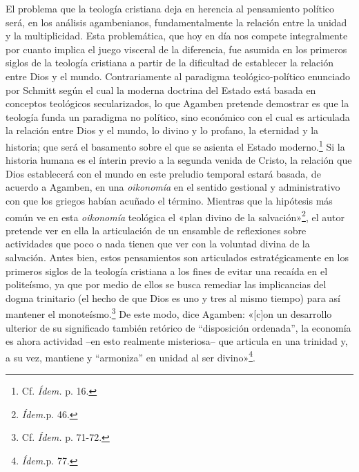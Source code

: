 El problema que la teología cristiana deja en herencia al pensamiento político será, en los análisis agambenianos, fundamentalmente la relación entre la unidad y la multiplicidad. Esta problemática, que hoy en día nos compete integralmente por cuanto implica el juego visceral de la diferencia, fue asumida en los primeros siglos de la teología cristiana a partir de la dificultad de establecer la relación entre Dios y el mundo. Contrariamente al paradigma teológico-político enunciado por Schmitt según el cual la moderna doctrina del Estado está basada en conceptos teológicos secularizados, lo que Agamben pretende demostrar es que la teología funda un paradigma no político, sino económico con el cual es articulada la relación entre Dios y el mundo, lo divino y lo profano, la eternidad y la historia; que será el basamento sobre el que se asienta el Estado moderno.\footnote{Cf. \emph{Ídem.} p. 16.} Si la historia humana es el ínterin previo a la segunda venida de Cristo, la relación que Dios establecerá con el mundo en este preludio temporal estará basada, de acuerdo a Agamben, en una \emph{oikonomía} en el sentido gestional y administrativo con que los griegos habían acuñado el término. Mientras que la hipótesis más común ve en esta \emph{oikonomía} teológica el «plan divino de la salvación»\footnote{\emph{Ídem.}p. 46.}, el autor pretende ver en ella la articulación de un ensamble de reflexiones sobre actividades que poco o nada tienen que ver con la voluntad divina de la salvación. Antes bien, estos pensamientos son articulados estratégicamente en los primeros siglos de la teología cristiana a los fines de evitar una recaída en el politeísmo, ya que por medio de ellos se busca remediar las implicancias del dogma trinitario (el hecho de que Dios es uno y tres al mismo tiempo) para así mantener el monoteísmo.\footnote{Cf. \emph{Ídem.} p. 71-72.} De este modo, dice Agamben: «{[}c{]}on un desarrollo ulterior de su significado también retórico de ``disposición ordenada'', la economía es ahora actividad --en esto realmente misteriosa-- que articula en una trinidad y, a su vez, mantiene y ``armoniza'' en unidad al ser divino»\footnote{\emph{Ídem.}p. 77.}.


